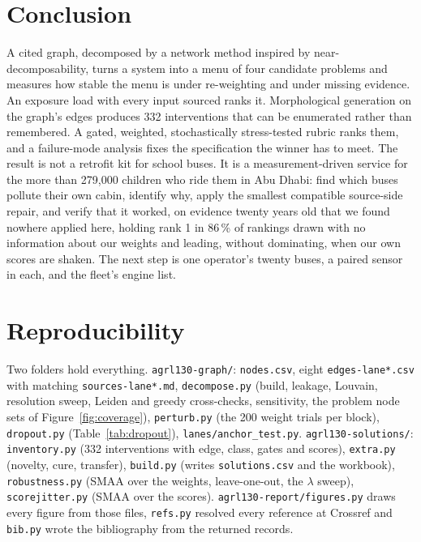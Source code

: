 \documentclass[10pt,a4paper]{article}
\begin{document}
\section{Conclusion}
A cited graph, decomposed by a network method inspired by near-decomposability, turns a system into a menu of four candidate problems and measures how stable the menu is under re-weighting and under missing evidence. An exposure load with every input sourced ranks it. Morphological generation on the graph's edges produces 332 interventions that can be enumerated rather than remembered. A gated, weighted, stochastically stress-tested rubric ranks them, and a failure-mode analysis fixes the specification the winner has to meet. The result is not a retrofit kit for school buses. It is a measurement-driven service for the more than 279,000 children who ride them in Abu Dhabi: find which buses pollute their own cabin, identify why, apply the smallest compatible source-side repair, and verify that it worked, on evidence twenty years old that we found nowhere applied here, holding rank 1 in 86\,\% of rankings drawn with no information about our weights and leading, without dominating, when our own scores are shaken. The next step is one operator's twenty buses, a paired sensor in each, and the fleet's engine list.

\appendix
\section{Reproducibility}\label{app:repro}
\begin{sloppypar}Two folders hold everything. \texttt{agrl130-graph/}: \texttt{nodes.csv}, eight \texttt{edges-lane*.csv} with matching \texttt{sources-lane*.md}, \texttt{decompose.py} (build, leakage, Louvain, resolution sweep, Leiden and greedy cross-checks, sensitivity, the problem node sets of Figure~\ref{fig:coverage}), \texttt{perturb.py} (the 200 weight trials per block), \texttt{dropout.py} (Table~\ref{tab:dropout}), \texttt{lanes/anchor\_test.py}. \texttt{agrl130-solutions/}: \texttt{inventory.py} (332 interventions with edge, class, gates and scores), \texttt{extra.py} (novelty, cure, transfer), \texttt{build.py} (writes \texttt{solutions.csv} and the workbook), \texttt{robustness.py} (SMAA over the weights, leave-one-out, the \(\lambda\) sweep), \texttt{scorejitter.py} (SMAA over the scores). \texttt{agrl130-report/figures.py} draws every figure from those files, \texttt{refs.py} resolved every reference at Crossref and \texttt{bib.py} wrote the bibliography from the returned records.\end{sloppypar}



\end{document}
